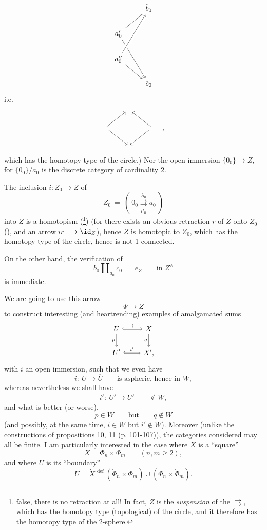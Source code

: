 \[
\begin{tikzcd}
& \tilde{b}_0 \\
a'_0 \arrow[ur] \arrow[ddr] & \\
a''_0 \arrow[uur, crossing over] \arrow[dr] & \\
& \tilde{c}_0
\end{tikzcd}
\]
i.e.
\[
\begin{tikzcd}
& {} & \\
{} \arrow[ur] \arrow[dr] & & {} \arrow[ul] \arrow[dl] \\
& {} &
\end{tikzcd}
\quad ,
\]
which has the homotopy type of the circle.) Nor the open immersion $\{0_0\} \longrightarrow Z$, for $\{0_0\}/a_0$ is the discrete category of cardinality 2.

The inclusion $i : Z_0 \longrightarrow Z$ of
\[ Z_0 \ = \ (\ 0_0 \overset{\lambda_0}{\underset{\mu_0}{\rightrightarrows}} a_0\ ) \]
into $Z$ is a homotopism (\footnote[7]{false, there is no retraction at all! In fact, $Z$ is the \textit{suspension} of the $\rightrightarrows$, which has the homotopy type (topological) of the circle, and it therefore has the homotopy type of the 2-sphere.}) (for there exists an obvious retraction $r$ of $Z$ onto $Z_0$ (\footnotemark[7]), and an arrow $ir \longrightarrow \id_Z$), hence $Z$ is homotopic to $Z_0$, which has the homotopy type of the circle, hence is not 1-connected.

On the other hand, the verification of
\[ b_0 \amalg_{a_0} c_0 \ = \ e_Z \qquad \text{in } Z^{\wedge} \]
is immediate.

We are going to use this arrow
\[ \Psi \longrightarrow Z \]
to construct interesting (and heartrending) examples of amalgamated sums
\[
\begin{tikzcd}
U \arrow[r, hook, "i"] \arrow[d, "p"'] & X \arrow[d, "q"'] \\
U' \arrow[r, hook, "i'"] & X',
\end{tikzcd}
\]
with $i$ an open immersion, such that we even have
\[ i :\ U \longrightarrow \overline{U} \qquad \text{is aspheric, hence in } W, \]
whereas nevertheless we shall have
\[ i' :\ U' \longrightarrow \overline{U'} \qquad \notin W, \]
and what is better (or worse),
\[ p \in W \qquad \text{but} \qquad q \notin W \]
(and possibly, at the same time, $i \in W$ but $i' \notin W$). Moreover (unlike the constructions of propositions 10, 11 (p. 101-107)), the categories considered may all be finite. I am particularly interested in the case where $X$ is a ``square''
\[ X = \Phi_n \times \Phi_m \qquad (n,m \geq 2), \]
and where $U$ is its ``boundary''
\[ U = \dot{X} \overset{\text{def}}{=} (\dot{\Phi}_n \times \Phi_m) \cup (\Phi_n \times \dot{\Phi}_m). \]

